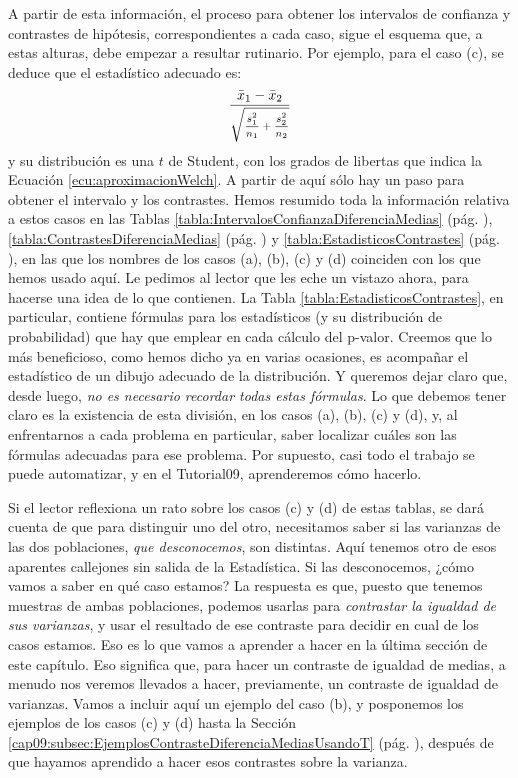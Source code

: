 A partir de esta información, el proceso para obtener los intervalos de confianza y contrastes de hipótesis, correspondientes a cada caso, sigue el esquema que, a estas alturas, debe empezar a resultar rutinario. Por ejemplo, para el caso (c), se deduce que el estadístico adecuado es:
\[\dfrac{\bar x_1-\bar x_2}{\mbox{\scriptsize{$\sqrt{\dfrac{s_1^2}{n_1}+\dfrac{s_2^2}{n_2}}$}}}\]
y su distribución es una $t$ de Student, con los grados de libertas que indica la Ecuación \ref{ecu:aproximacionWelch}. A partir de aquí sólo hay un paso para obtener el intervalo y los contrastes. Hemos resumido toda la información relativa a estos casos en las Tablas \ref{tabla:IntervalosConfianzaDiferenciaMedias} (pág. \pageref{tabla:IntervalosConfianzaDiferenciaMedias}),  \ref{tabla:ContrastesDiferenciaMedias} (pág. \pageref{tabla:ContrastesDiferenciaMedias}) y \ref{tabla:EstadisticosContrastes} (pág. \pageref{tabla:EstadisticosContrastes}), en las que los nombres de los casos (a), (b), (c) y (d) coinciden con los que hemos usado aquí. Le pedimos al lector que les eche un vistazo ahora, para hacerse una idea de lo que contienen. La Tabla \ref{tabla:EstadisticosContrastes}, en particular, contiene fórmulas para los estadísticos  (y su distribución de probabilidad) que hay que emplear en cada cálculo del p-valor. Creemos que lo más beneficioso, como hemos dicho ya en varias ocasiones,  es acompañar el estadístico de un dibujo adecuado de la distribución. Y queremos dejar claro que, desde luego, {\em no es necesario recordar todas estas fórmulas}. Lo que debemos tener claro es la existencia de esta división, en los casos (a), (b), (c) y (d), y, al enfrentarnos a cada problema en particular, saber localizar cuáles son las fórmulas adecuadas para ese problema.
Por supuesto, casi todo el trabajo se puede automatizar, y en el Tutorial09, aprenderemos cómo hacerlo.

Si el lector reflexiona un rato sobre los casos (c) y (d) de estas tablas, se dará cuenta de que para distinguir uno del otro, necesitamos saber si las varianzas de las dos poblaciones, {\em que desconocemos}, son distintas. Aquí tenemos otro de esos aparentes callejones sin salida de la Estadística. Si las desconocemos, ¿cómo vamos a saber en qué caso estamos? La respuesta es que, puesto que tenemos muestras de ambas poblaciones, podemos usarlas para {\em contrastar la igualdad de sus varianzas}, y usar el resultado de ese contraste para decidir en cual de los casos estamos. Eso es lo que vamos a aprender a hacer en la última sección de este capítulo. Eso significa que, para hacer un contraste de igualdad de medias, a menudo nos veremos llevados a hacer, previamente, un contraste de igualdad de varianzas. Vamos a incluir aquí un ejemplo del caso (b), y posponemos los ejemplos de los casos (c) y (d) hasta la Sección \ref{cap09:subsec:EjemplosContrasteDiferenciaMediasUsandoT} (pág. \pageref{cap09:subsec:EjemplosContrasteDiferenciaMediasUsandoT}), después de que hayamos aprendido a hacer esos contrastes sobre la varianza.

